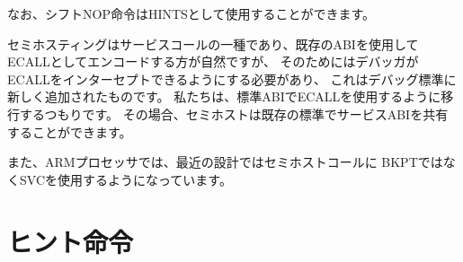 \begin{commentary}
\begin{comment}
   The shift NOP instructions are still considered available for use as
   HINTS.
\end{comment}

なお、シフトNOP命令はHINTSとして使用することができます。

\begin{comment}
   Semihosting is a form of service call and would be more naturally
   encoded as an ECALL using an existing ABI, but this would require
   the debugger to be able to intercept ECALLs, which is a newer
   addition to the debug standard.  We intend to move over to using
   ECALLs with a standard ABI, in which case, semihosting can share a
   service ABI with an existing standard.
\end{comment}

セミホスティングはサービスコールの一種であり、既存のABIを使用してECALLとしてエンコードする方が自然ですが、
そのためにはデバッガがECALLをインターセプトできるようにする必要があり、
これはデバッグ標準に新しく追加されたものです。 
私たちは、標準ABIでECALLを使用するように移行するつもりです。
その場合、セミホストは既存の標準でサービスABIを共有することができます。

\begin{comment}
   We note that ARM processors have also moved to using SVC instead of
   BKPT for semihosting calls in newer designs.
\end{comment}

また、ARMプロセッサでは、最近の設計ではセミホストコールに
BKPTではなくSVCを使用するようになっています。
\end{commentary}

\begin{comment}
\section{HINT Instructions}
\end{comment}
\section{ヒント命令}
\label{sec:rv32i-hints}

\begin{comment}
RV32I reserves a large encoding space for HINT instructions, which are
usually used to communicate performance hints to the
microarchitecture.
Like the NOP instruction, HINTs do not change any architecturally visible
state, except for advancing the {\tt pc} and any applicable performance
counters.
Implementations are always allowed to ignore the encoded hints.
\end{comment}

